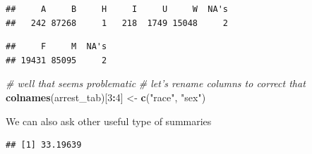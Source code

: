 \documentclass[]{book}
\newenvironment{Shaded}{\begin{snugshade}}{\end{snugshade}}
\newcommand{\KeywordTok}[1]{\textcolor[rgb]{0.13,0.29,0.53}{\textbf{#1}}}
\newcommand{\DecValTok}[1]{\textcolor[rgb]{0.00,0.00,0.81}{#1}}
\newcommand{\StringTok}[1]{\textcolor[rgb]{0.31,0.60,0.02}{#1}}
\newcommand{\CommentTok}[1]{\textcolor[rgb]{0.56,0.35,0.01}{\textit{#1}}}
\newcommand{\OperatorTok}[1]{\textcolor[rgb]{0.81,0.36,0.00}{\textbf{#1}}}
\newcommand{\NormalTok}[1]{#1}
\theoremstyle{definition}
\theoremstyle{definition}
\theoremstyle{remark}
\begin{document}
\begin{Shaded}
\end{Shaded}

\begin{verbatim}
##     A     B     H     I     U     W  NA's 
##   242 87268     1   218  1749 15048     2
\end{verbatim}

\begin{Shaded}
\end{Shaded}

\begin{verbatim}
##     F     M  NA's 
## 19431 85095     2
\end{verbatim}

\begin{Shaded}
\begin{Highlighting}[]
\CommentTok{# well that seems problematic}
\CommentTok{# let's rename columns to correct that}
\KeywordTok{colnames}\NormalTok{(arrest_tab)[}\DecValTok{3}\OperatorTok{:}\DecValTok{4}\NormalTok{] <-}\StringTok{ }\KeywordTok{c}\NormalTok{(}\StringTok{"race"}\NormalTok{, }\StringTok{"sex"}\NormalTok{)}
\end{Highlighting}
\end{Shaded}

We can also ask other useful type of summaries

\begin{Shaded}
\end{Shaded}

\begin{verbatim}
## [1] 33.19639
\end{verbatim}

\begin{Shaded}
\end{Shaded}
\end{document}
